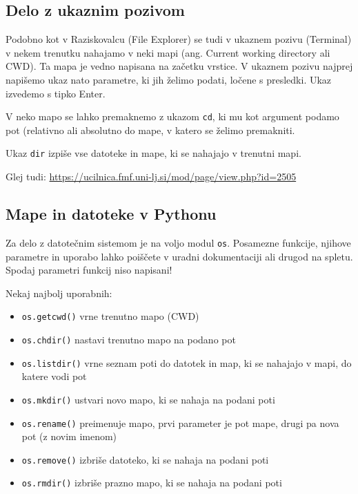 \documentclass[
]{report}
\providecommand{\tightlist}{%
  \setlength{\itemsep}{0pt}\setlength{\parskip}{0pt}}
\begin{document}
\hypertarget{delo-z-ukaznim-pozivom}{%
\subsection{Delo z ukaznim pozivom}\label{delo-z-ukaznim-pozivom}}

Podobno kot v Raziskovalcu (File Explorer) se tudi v ukaznem pozivu (Terminal) v
nekem trenutku nahajamo v neki mapi (ang. Current working directory ali CWD).
Ta mapa je vedno napisana na začetku vrstice. V ukaznem pozivu najprej napišemo ukaz nato parametre, ki jih želimo podati, ločene s presledki. Ukaz izvedemo s tipko Enter.

V neko mapo se lahko premaknemo z ukazom \texttt{cd}, ki mu kot argument podamo pot
(relativno ali absolutno do mape, v katero se želimo premakniti.

Ukaz \texttt{dir} izpiše vse datoteke in mape, ki se nahajajo v trenutni mapi.

Glej tudi: \url{https://ucilnica.fmf.uni-lj.si/mod/page/view.php?id=2505}

\hypertarget{mape-in-datoteke-v-pythonu}{%
\subsection{Mape in datoteke v Pythonu}\label{mape-in-datoteke-v-pythonu}}

Za delo z datotečnim sistemom je na voljo modul \texttt{os}.
Posamezne funkcije, njihove parametre in uporabo lahko poiščete v uradni
dokumentaciji ali drugod na spletu. Spodaj parametri funkcij niso napisani!

Nekaj najbolj uporabnih:

\begin{itemize}
\tightlist
\item
  \texttt{os.getcwd()} vrne trenutno mapo (CWD)
\item
  \texttt{os.chdir()} nastavi trenutno mapo na podano pot
\item
  \texttt{os.listdir()} vrne seznam poti do datotek in map, ki se nahajajo v mapi, do katere vodi pot
\item
  \texttt{os.mkdir()} ustvari novo mapo, ki se nahaja na podani poti
\item
  \texttt{os.rename()} preimenuje mapo, prvi parameter je pot mape, drugi pa nova pot (z novim imenom)
\item
  \texttt{os.remove()} izbriše datoteko, ki se nahaja na podani poti
\item
  \texttt{os.rmdir()} izbriše prazno mapo, ki se nahaja na podani poti
\end{itemize}
\end{document}
